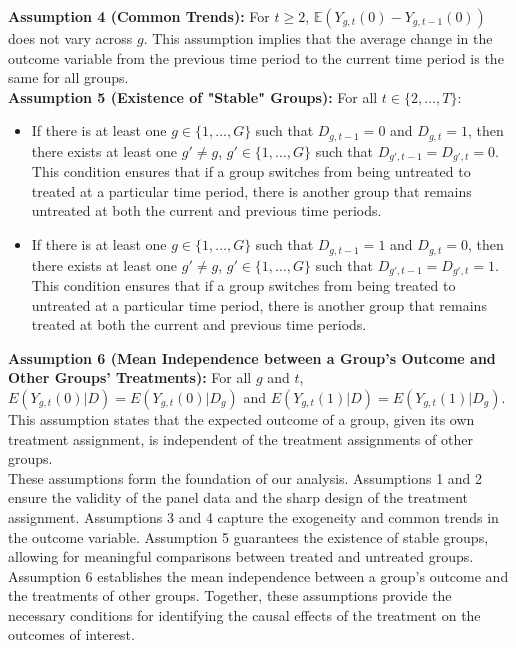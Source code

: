 \documentclass[oneside,11pt]{article}
\begin{document}
\textbf{Assumption 4 (Common Trends):} For $t \geq 2$, $\mathbb{E}(Y_{g,t}(0) - Y_{g,t-1}(0))$ does not vary across $g$. This assumption implies that the average change in the outcome variable from the previous time period to the current time period is the same for all groups. \\

\textbf{Assumption 5 (Existence of "Stable" Groups):} For all $t \in \{2, \ldots, T\}$:
\begin{itemize}
    \item If there is at least one $g \in \{1, \ldots, G\}$ such that $D_{g,t-1} = 0$ and $D_{g,t} = 1$, then there exists at least one $g' \neq g$, $g' \in \{1, \ldots, G\}$ such that $D_{g',t-1} = D_{g',t} = 0$. This condition ensures that if a group switches from being untreated to treated at a particular time period, there is another group that remains untreated at both the current and previous time periods.
    \item If there is at least one $g \in \{1, \ldots, G\}$ such that $D_{g,t-1} = 1$ and $D_{g,t} = 0$, then there exists at least one $g' \neq g$, $g' \in \{1, \ldots, G\}$ such that $D_{g',t-1} = D_{g',t} = 1$. This condition ensures that if a group switches from being treated to untreated at a particular time period, there is another group that remains treated at both the current and previous time periods.
\end{itemize}

\textbf{Assumption 6 (Mean Independence between a Group's Outcome and Other Groups' Treatments):} For all $g$ and $t$, $E(Y_{g,t}(0)|D) = E(Y_{g,t}(0)|D_g)$ and $E(Y_{g,t}(1)|D) = E(Y_{g,t}(1)|D_g)$. This assumption states that the expected outcome of a group, given its own treatment assignment, is independent of the treatment assignments of other groups. \\

These assumptions form the foundation of our analysis. Assumptions 1 and 2 ensure the validity of the panel data and the sharp design of the treatment assignment. Assumptions 3 and 4 capture the exogeneity and common trends in the outcome variable. Assumption 5 guarantees the existence of stable groups, allowing for meaningful comparisons between treated and untreated groups. Assumption 6 establishes the mean independence between a group's outcome and the treatments of other groups. Together, these assumptions provide the necessary conditions for identifying the causal effects of the treatment on the outcomes of interest. 
\end{document}
